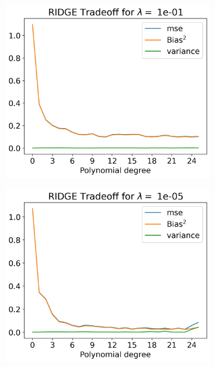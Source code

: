 \documentclass[12pt]{article}
\begin{document}
\begin{figure}[H]
  \begin{subfigure}{.5\textwidth}
    \centering
    \includegraphics[width=\textwidth]{../figures/tradeoff_RIDGE_1e-01real.png}
    \caption{}
    \label{fig:}
  \end{subfigure}
  \begin{subfigure}{.5\textwidth}
    \centering
    \includegraphics[width=\textwidth]{../figures/tradeoff_RIDGE_1e-05real.png}
    \caption{}
    \label{fig:}
  \end{subfigure}

\end{figure}
\end{document}
